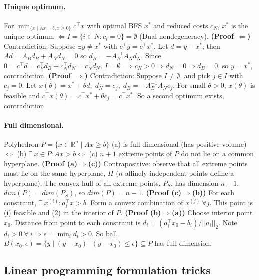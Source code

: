 \documentclass{article}
\begin{document}
\paragraph{Unique optimum.}
For $\min_{\{x \mid Ax=b, x\geq0\}} c^\top x$ with optimal BFS $x^*$ and reduced costs $\bar c_N$,
$x^*$ is the unique optimum $\iff I=\{i\in N : \bar c_i=0\}=\emptyset$ (Dual nondegeneracy).
\textbf{(Proof $\Leftarrow$)} Contradiction: 
Suppose $\exists y\neq x^*$ with $c^\top y=c^\top x^*$.  
Let $d=y-x^*$; then $Ad=A_Bd_B + A_Nd_N=0$ so $d_B = -A_B^{-1}A_N d_N$. 
Since $0 = c^\top d  = c_B^\top d_B + c_N^\top d_N = \bar c_N^\top d_N$. 
$I=\emptyset \implies \bar c_N>0\Rightarrow d_N=0\Rightarrow d_B=0$, so $y=x^*$, contradiction.
\textbf{(Proof $\Rightarrow$)} Contradiction:
Suppose $I\neq\emptyset$, and pick $j\in I$ with $\bar c_j=0$. Let $x(\theta)=x^*+\theta d,\; d_N=e_j,\; d_B=-A_B^{-1}A_N e_j$. 
For small $\theta>0$, $x(\theta)$ is feasible and $c^\top x(\theta)=c^\top x^*+\theta\bar c_j=c^\top x^*$. So a second optimum exists, contradiction



\paragraph{Full dimensional.} Polyhedron $P=\{x \in \mathbb R^n \mid Ax\geq b\}$ (a) is full dimensional (has positive volume) $\iff$ (b) $\exists\ x\in P: Ax > b \iff$ (c) $n+1$ extreme points of $P$ do not lie on a common hyperplane. \textbf{(Proof (a)$\Rightarrow$(c))} Contrapositive: observe that all extreme points must lie on the same hyperplane, $H$ ($n$ affinely independent points define a hyperplane). The convex hull of all extreme points, $P_S$, has dimension $n-1$. $dim(P) = dim(P_S)$, so $dim(P)=n-1$. \textbf{(Proof (c)$\Rightarrow$(b))} For each constraint, $\exists\ x^{(i)}: a_i^\top x > b$. Form a convex combination of $x^{(j)}\ \forall j$. This point is (i) feasible and (2) in the interior of $P$. \textbf{(Proof (b)$\Rightarrow$(a))} Choose interior point $x_0$. Distance from point to each constraint is $d_i = (a_i^\top x_0 - b_i)/||a_i||_2$. Note $d_i > 0\ \forall\ i \Rightarrow \epsilon = \min_i d_i > 0$. So ball $B(x_0,\epsilon) = \{y\mid (y - x_0)^\top(y-x_0) \leq \epsilon\} \subseteq P$ has full dimension.




\subsection{Linear programming formulation tricks}
\end{document}
